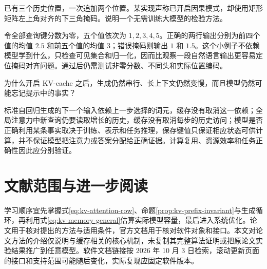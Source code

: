 \documentclass[UTF8,12pt,a4paper,fontset=fandol]{ctexart}
\begin{document}
\begin{example}[设计一个能发现掩码错误的测试]
已有三个历史位置，一次追加两个位置。某实现声称已开启因果模式，却使用矩形矩阵左上角对齐的下三角掩码。说明一个无需训练大模型的检验方法。
\end{example}
\begin{solve}
令全部查询键分数为零，五个值依次为 $1,2,3,4,5$。正确的两行输出分别为前四个值的均值 $2.5$ 和前五个值的均值 $3$；错误掩码则输出 $1$ 和 $1.5$。这个小例子不依赖模型学到什么，只检查可见集合和归一化，因而比观察一段自然语言输出更容易定位掩码对齐问题。通过后仍需测试非零分数、不同头和实际位置编码。
\end{solve}

\begin{example}[解释缓存没有解决的三件事]
为什么开启 KV-cache 之后，生成仍然串行、长上下文仍然变慢，而且模型仍然可能忘记提示中的事实？
\end{example}
\begin{solve}
标准自回归生成的下一个输入依赖上一步选择的词元，缓存没有取消这一依赖；全局注意力中新查询仍要读取增长的历史，缓存没有取消每步的历史访问；模型是否正确利用某条事实取决于训练、表示和任务推理，保存键值只保证相应状态可供计算，并不保证模型把注意力或答案分配给正确证据。计算复用、资源效率和任务正确性因此应分别验证。
\end{solve}

\section{文献范围与进一步阅读}

学习顺序宜先掌握式\eqref{eq:kv-attention-row}、命题\ref{prop:kv-prefix-invariant}与生成循环，再利用式\eqref{eq:kv-memory-general}估算实际模型容量，最后进入系统优化。论文用于核对提出的方法与适用条件，官方文档用于核对软件对象和接口。本文对论文方法的介绍仅说明与缓存相关的核心机制，未复制其完整算法证明或把原论文实验结果推广到任意模型。软件文档链接按 2026 年 10 月 3 日检索，滚动更新页面的接口和支持范围可能随后变化，实际复现应固定软件版本。
\end{document}
